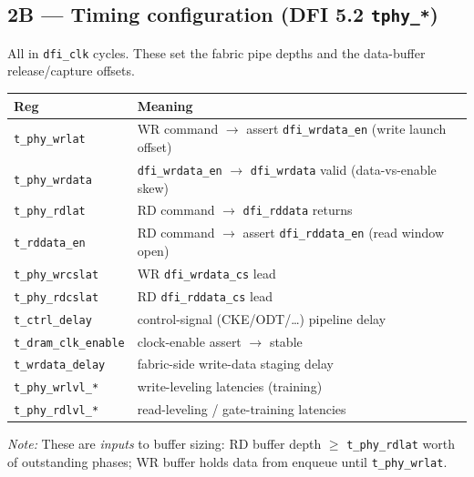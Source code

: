 \documentclass[11pt]{article}
\newcommand{\sig}[1]{\texttt{#1}}
\newcommand{\reg}[1]{\texttt{#1}}
\newcommand{\note}[1]{\par\smallskip\noindent\textit{Note:} #1\par}
\begin{document}
\subsection{2B --- Timing configuration (DFI 5.2 \sig{tphy\_*})}
All in \sig{dfi\_clk} cycles. These set the fabric pipe depths and the data-buffer
release/capture offsets.
\begin{center}\begin{tabular}{@{}lL{9.6cm}@{}}\toprule
Reg & Meaning \\ \midrule
\reg{t\_phy\_wrlat} & WR command $\to$ assert \sig{dfi\_wrdata\_en} (write launch offset) \\
\reg{t\_phy\_wrdata} & \sig{dfi\_wrdata\_en} $\to$ \sig{dfi\_wrdata} valid (data-vs-enable skew) \\
\reg{t\_phy\_rdlat} & RD command $\to$ \sig{dfi\_rddata} returns \\
\reg{t\_rddata\_en} & RD command $\to$ assert \sig{dfi\_rddata\_en} (read window open) \\
\reg{t\_phy\_wrcslat} & WR \sig{dfi\_wrdata\_cs} lead \\
\reg{t\_phy\_rdcslat} & RD \sig{dfi\_rddata\_cs} lead \\
\reg{t\_ctrl\_delay} & control-signal (CKE/ODT/\ldots) pipeline delay \\
\reg{t\_dram\_clk\_enable} & clock-enable assert $\to$ stable \\
\reg{t\_wrdata\_delay} & fabric-side write-data staging delay \\
\reg{t\_phy\_wrlvl\_*} & write-leveling latencies (training) \\
\reg{t\_phy\_rdlvl\_*} & read-leveling / gate-training latencies \\ \bottomrule
\end{tabular}\end{center}
\note{These are \emph{inputs} to buffer sizing: RD buffer depth $\ge$ \sig{t\_phy\_rdlat}
worth of outstanding phases; WR buffer holds data from enqueue until \sig{t\_phy\_wrlat}.}
\end{document}
